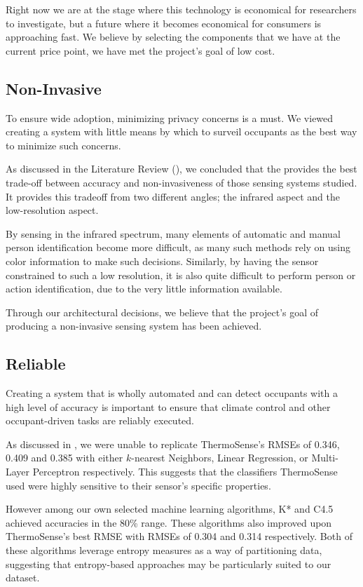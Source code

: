 \documentclass[../thesis/thesis.tex]{subfiles}
\begin{document}
Right now we are at the stage where this technology is economical for researchers to investigate, but a future where it becomes economical for consumers is approaching fast. We believe by selecting the components that we have at the current price point, we have met the project's goal of low cost.

\subsection{Non-Invasive}
To ensure wide adoption, minimizing privacy concerns is a must. We viewed creating a system with little means by which to  surveil occupants as the best way to minimize such concerns.

As discussed in the Literature Review (), we concluded that the \mlx provides the best trade-off between accuracy and non-invasiveness of those sensing systems studied. It provides this tradeoff from two different angles; the infrared aspect and the low-resolution aspect. 

By sensing in the infrared spectrum, many elements of automatic and manual person identification become more difficult, as many such methods rely on using color information to make such decisions. Similarly, by having the sensor constrained to such a low resolution, it is also quite difficult to perform person or action identification, due to the very little information available.

Through our architectural decisions, we believe that the project's goal of producing a non-invasive sensing system has been achieved.

\subsection{Reliable}
Creating a system that is wholly automated and can detect occupants with a high level of accuracy is important to ensure that climate control and other occupant-driven tasks are reliably executed.

As discussed in , we were unable to replicate ThermoSense's RMSEs of 0.346, 0.409 and 0.385 with either $k$-nearest Neighbors, Linear Regression, or Multi-Layer Perceptron respectively. This suggests that the classifiers ThermoSense used were highly sensitive to their sensor's specific properties.

However among our own selected machine learning algorithms, K* and C4.5 achieved accuracies in the 80\% range. These algorithms also improved upon ThermoSense's best RMSE with RMSEs of 0.304 and 0.314 respectively. Both of these algorithms leverage entropy measures as a way of partitioning data, suggesting that entropy-based approaches may be particularly suited to our dataset.
\end{document}
